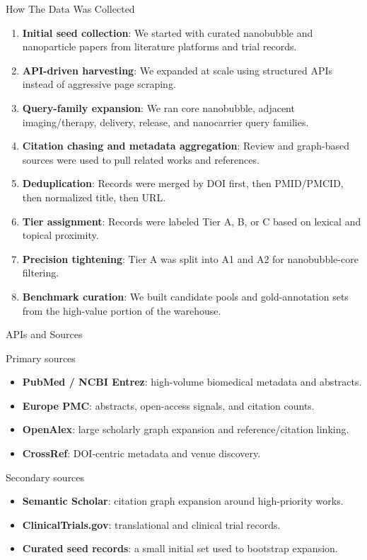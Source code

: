 \documentclass[aspectratio=169]{beamer}
\begin{document}
\begin{frame}{How The Data Was Collected}
\begin{enumerate}
    \item \textbf{Initial seed collection}: We started with curated nanobubble and nanoparticle papers from literature platforms and trial records.
    \item \textbf{API-driven harvesting}: We expanded at scale using structured APIs instead of aggressive page scraping.
    \item \textbf{Query-family expansion}: We ran core nanobubble, adjacent imaging/therapy, delivery, release, and nanocarrier query families.
    \item \textbf{Citation chasing and metadata aggregation}: Review and graph-based sources were used to pull related works and references.
    \item \textbf{Deduplication}: Records were merged by DOI first, then PMID/PMCID, then normalized title, then URL.
    \item \textbf{Tier assignment}: Records were labeled Tier A, B, or C based on lexical and topical proximity.
    \item \textbf{Precision tightening}: Tier A was split into A1 and A2 for nanobubble-core filtering.
    \item \textbf{Benchmark curation}: We built candidate pools and gold-annotation sets from the high-value portion of the warehouse.
\end{enumerate}
\end{frame}

\begin{frame}{APIs and Sources}
\begin{block}{Primary sources}
\begin{itemize}
    \item \textbf{PubMed / NCBI Entrez}: high-volume biomedical metadata and abstracts.
    \item \textbf{Europe PMC}: abstracts, open-access signals, and citation counts.
    \item \textbf{OpenAlex}: large scholarly graph expansion and reference/citation linking.
    \item \textbf{CrossRef}: DOI-centric metadata and venue discovery.
\end{itemize}
\end{block}
\begin{block}{Secondary sources}
\begin{itemize}
    \item \textbf{Semantic Scholar}: citation graph expansion around high-priority works.
    \item \textbf{ClinicalTrials.gov}: translational and clinical trial records.
    \item \textbf{Curated seed records}: a small initial set used to bootstrap expansion.
\end{itemize}
\end{block}
\end{frame}
\end{document}
